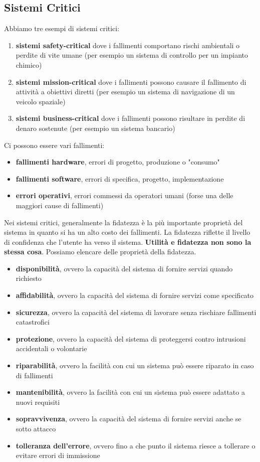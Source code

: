 \documentclass[a4paper,12pt, oneside]{book}
\begin{document}
\subsection{Sistemi Critici}
Abbiamo tre esempi di sistemi critici:
\begin{enumerate}
\item \textbf{sistemi safety-critical} dove i fallimenti comportano rischi ambientali o perdite di vite umane (per esempio un sistema di controllo per un impianto chimico)
\item \textbf{sistemi mission-critical} dove i fallimenti possono causare il fallimento di attività a obiettivi
diretti (per esempio un sistema di navigazione di un veicolo spaziale)
\item \textbf{sistemi business-critical} dove i fallimenti possono risultare in perdite di denaro sostenute (per esempio un sistema bancario)
\end{enumerate}
Ci possono essere vari fallimenti:
\begin{itemize}
\item \textbf{fallimenti hardware}, errori di progetto, produzione o "consumo"
\item \textbf{fallimenti software}, errori di specifica, progetto, implementazione
\item \textbf{errori operativi}, errori commessi da operatori umani (forse una delle maggiori cause di fallimenti)
\end{itemize}
Nei sistemi critici, generalmente la fidatezza è la più importante proprietà del sistema in quanto si ha un alto costo dei fallimenti. La fidatezza riflette il livello di confidenza che l'utente ha verso il sistema. \textbf{Utilità e fidatezza non sono la stessa cosa}. Possiamo elencare delle proprietà della fidatezza.
\begin{itemize}
\item \textbf{disponibilità}, ovvero la capacità del sistema di fornire servizi quando richiesto
\item \textbf{affidabilità}, ovvero la capacità del sistema
di fornire servizi come specificato
\item \textbf{sicurezza}, ovvero la capacità del sistema di
lavorare senza rischiare fallimenti catastrofici
\item \textbf{protezione}, ovvero la capacità del sistema
di proteggersi contro intrusioni accidentali o volontarie
\item \textbf{riparabilità}, ovvero la facilità con cui un sistema può essere riparato in caso di fallimenti
\item \textbf{mantenibilità}, ovvero la facilità con cui un sistema può essere adattato a nuovi requisiti
\item \textbf{sopravvivenza}, ovvero la capacità del sistema di fornire servizi anche se sotto attacco
\item \textbf{tolleranza dell'errore}, ovvero fino a che punto il sistema riesce a tollerare o evitare errori di immissione 
\end{itemize}
\end{document}
